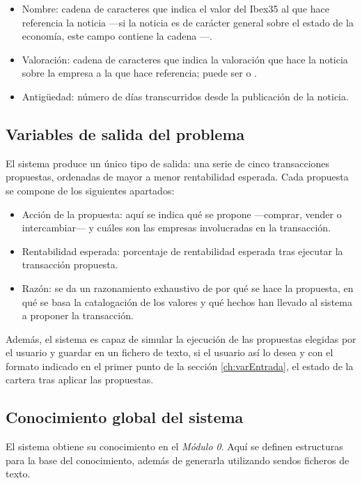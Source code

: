 \documentclass[a4paper, 11pt, titlepage]{article}
\theoremstyle{definition}
\begin{document}
\begin{enumerate}
        \begin{itemize}
            \item Nombre: cadena de caracteres que indica el valor del Ibex35 al que hace referencia la noticia ---si la noticia es de carácter general sobre el estado de la economía, este campo contiene la cadena ---.
            \item Valoración: cadena de caracteres que indica la valoración que hace la noticia sobre la empresa a la que hace referencia; puede ser  o .
            \item Antigüedad: número de días transcurridos desde la publicación de la noticia.
        \end{itemize}
    \end{enumerate}

  \subsection{Variables de salida del problema}

  El sistema produce un único tipo de salida: una serie de cinco transacciones propuestas, ordenadas de mayor a menor rentabilidad esperada. Cada propuesta se compone de los siguientes apartados:
  \begin{itemize}
      \item Acción de la propuesta: aquí se indica qué se propone ---comprar, vender o intercambiar--- y cuáles son las empresas involucradas en la transacción.
      \item Rentabilidad esperada: porcentaje de rentabilidad esperada tras ejecutar la transacción propuesta.
      \item Razón: se da un razonamiento exhaustivo de por qué se hace la propuesta, en qué se basa la catalogación de los valores y qué hechos han llevado al sistema a proponer la transacción.
  \end{itemize}

  Además, el sistema es capaz de simular la ejecución de las propuestas elegidas por el usuario y guardar en un fichero de texto, si el usuario así lo desea y con el formato indicado en el primer punto de la sección \ref{ch:varEntrada}, el estado de la cartera tras aplicar las propuestas.

  \subsection{Conocimiento global del sistema}
  El sistema obtiene su conocimiento en el \emph{Módulo 0}. Aquí se definen
  estructuras para la base del conocimiento, además de generarla utilizando
  sendos ficheros de texto.
\end{document}
